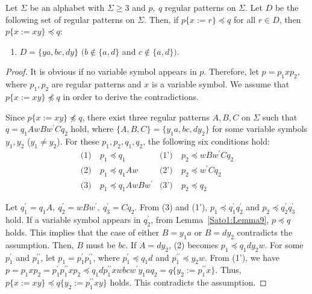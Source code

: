 
\begin{lem}\label{追加部分}
  Let $\Sigma$ be an alphabet with $\Sigma \ge 3$ and $p,~q$ regular patterns on $\Sigma$.
  Let $D$ be the following set of regular patterns on $\Sigma$.
  Then, if $p \{ x := r \} \preceq q$ for all $r \in D$, then $p \{ x := xy \} \preceq q$:
  \begin{enumerate}
  \item[] $D = \{ ya, bc, dy \}$ $(b \not\in \{a,d\}$ and $c \not\in \{a,d\})$.
  \end{enumerate}
\end{lem}

  \begin{proof}
  It is obvious if no variable symbol appears in $p$.
  Therefore, let $p=p_{1}xp_{2}$, where $p_{1}, p_{2}$ are regular patterns and $x$ is a variable symbol.
  We assume that $p \{ x := xy \} \not \preceq q$ in order to derive the contradictions.

  Since $p \{ x := xy \} \not \preceq q$, there exist three regular patterns $A,B,C$ on $\Sigma$ such that $q=q_{1}AwBw^{\prime}Cq_{2}$ hold, where $\{ A,B,C \} = \{ y_{1}a,bc,dy_{2} \}$ for some variable symbols $y_{1}, y_{2}$ ($y_{1} \not= y_{2}$).
  For these $p_{1},p_{2},q_{1},q_{2}$, the following six conditions hold:
  \begin{align*}
  \textrm{(1)}~& p_{1} \preceq q_{1} & \textrm{(1')}~& p_{2} \preceq wBw^{\prime}Cq_{2} \\
  \textrm{(2)}~& p_{1} \preceq q_{1}Aw & \textrm{(2')}~& p_{2} \preceq w^{\prime}Cq_{2} \\
  \textrm{(3)}~& p_{1} \preceq q_{1}AwBw^{\prime} & \textrm{(3')}~& p_{2} \preceq q_{2}
  \end{align*}
  
  Let $q^{\prime}_{1}=q_{1}A,~q^{\prime}_{2}=wBw^{\prime},~q^{\prime}_{3}=Cq_{2}$.
  From (3) and (1'), $p_{1} \preceq q^{\prime}_{1}q^{\prime}_{2}$ and $p_{2} \preceq q^{\prime}_{2}q^{\prime}_{3}$ hold.
  If a variable symbol appears in $q^{\prime}_{2}$, from Lemma~\ref{Sato1:Lemma9}, $p \preceq q$ holds.
  This implies that the case of either $B=y_{1}a$ or $B=dy_{2}$ contradicts the assumption.
  Then, $B$ must be $bc$.
  If $A=dy_{2}$,
  (2) becomes $p_{1} \preceq q_{1}dy_{2}w$.
  For some $p^{\prime}_{1}$ and $p^{\prime\prime}_{1}$, let $p_{1}=p^{\prime}_{1}p^{\prime\prime}_{1}$, where $p^{\prime}_{1} \preceq q_{1}d$ and $p^{\prime\prime}_{1} \preceq y_{2}w$. 
  From (1'), we have $p=p_{1}xp_{2}=p^{\prime}_{1}p^{\prime\prime}_{1}xp_{2} \preceq q_{1}dp^{\prime\prime}_{1}xwbcw^{\prime}y_{1}aq_{2}=q \{ y_{2}:=p^{\prime\prime}_{1}x \}$.
  Thus, $p \{ x := xy \} \preceq q \{ y_{2}:=p^{\prime\prime}_{1}xy \}$ holds. This contradicts the assumption.


\end{proof}
